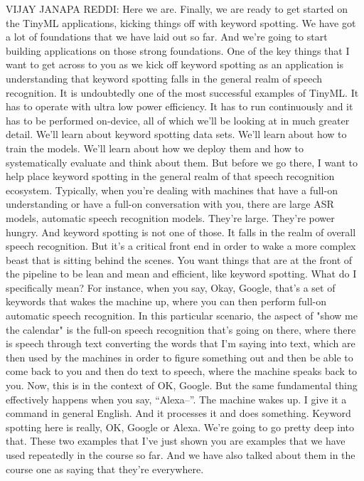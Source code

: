 VIJAY JANAPA REDDI: Here we are.
Finally, we are ready to get started on the TinyML applications,
kicking things off with keyword spotting.
We have got a lot of foundations that we have laid out so far.
And we're going to start building applications
on those strong foundations.
One of the key things that I want to get across to you as we kick off
keyword spotting as an application is understanding
that keyword spotting falls in the general realm of speech recognition.
It is undoubtedly one of the most successful examples of TinyML.
It has to operate with ultra low power efficiency.
It has to run continuously and it has to be performed on-device, all of which
we'll be looking at in much greater detail.
We'll learn about keyword spotting data sets.
We'll learn about how to train the models.
We'll learn about how we deploy them and how to systematically evaluate
and think about them.
But before we go there, I want to help place
keyword spotting in the general realm of that speech recognition ecosystem.
Typically, when you're dealing with machines
that have a full-on understanding or have a full-on conversation with you,
there are large ASR models, automatic speech recognition models.
They're large.
They're power hungry.
And keyword spotting is not one of those.
It falls in the realm of overall speech recognition.
But it's a critical front end in order to wake a more complex beast that
is sitting behind the scenes.
You want things that are at the front of the pipeline
to be lean and mean and efficient, like keyword spotting.
What do I specifically mean?
For instance, when you say, Okay, Google, that's
a set of keywords that wakes the machine up,
where you can then perform full-on automatic speech recognition.
In this particular scenario, the aspect of "show me the calendar"
is the full-on speech recognition that's going on there, where there is speech
through text converting the words that I'm saying into text, which are then
used by the machines in order to figure something out and then
be able to come back to you and then do text to speech,
where the machine speaks back to you.
Now, this is in the context of OK, Google.
But the same fundamental thing effectively happens when you say,
``Alexa--''.
The machine wakes up.
I give it a command in general English.
And it processes it and does something.
Keyword spotting here is really, OK, Google or Alexa.
We're going to go pretty deep into that.
These two examples that I've just shown you
are examples that we have used repeatedly in the course so far.
And we have also talked about them in the course one
as saying that they're everywhere.

